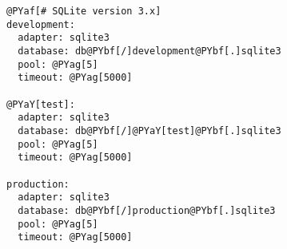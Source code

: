 \begin{Verbatim}[commandchars=@\[\]]
@PYaf[# SQLite version 3.x]
development:
  adapter: sqlite3
  database: db@PYbf[/]development@PYbf[.]sqlite3
  pool: @PYag[5]
  timeout: @PYag[5000]

@PYaY[test]:
  adapter: sqlite3
  database: db@PYbf[/]@PYaY[test]@PYbf[.]sqlite3
  pool: @PYag[5]
  timeout: @PYag[5000]

production:
  adapter: sqlite3
  database: db@PYbf[/]production@PYbf[.]sqlite3
  pool: @PYag[5]
  timeout: @PYag[5000]
\end{Verbatim}
